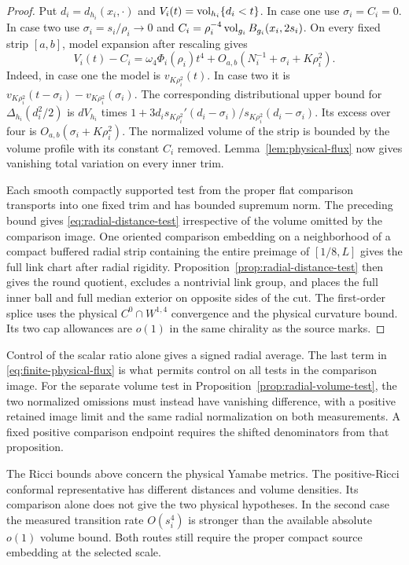 \begin{proof}
Put \(d_i=d_{h_i}(x_i,\cdot)\) and \(V_i(t)=\operatorname{vol}_{h_i}\{d_i<t\}\).
In case one use \(\sigma_i=C_i=0\). In case two use
\(\sigma_i=s_i/\rho_i\to0\) and
\(C_i=\rho_i^{-4}\operatorname{vol}_{g_i}B_{g_i}(x_i,2s_i)\).
On every fixed strip \([a,b]\), model expansion after
rescaling gives
\[
 V_i(t)-C_i=\omega_4\Phi_i(\rho_i)t^4
        +O_{a,b}(N_i^{-1}+\sigma_i+K\rho_i^2).
\]
Indeed, in case one the model is \(v_{K\rho_i^2}(t)\).
In case two it is
\(v_{K\rho_i^2}(t-\sigma_i)-v_{K\rho_i^2}(\sigma_i)\).
The corresponding distributional upper bound for
\(\Delta_{h_i}(d_i^2/2)\) is \(dV_{h_i}\) times
\(1+3d_i s_{K\rho_i^2}'(d_i-\sigma_i)/
s_{K\rho_i^2}(d_i-\sigma_i)\). Its excess over four is
\(O_{a,b}(\sigma_i+K\rho_i^2)\). The normalized volume
of the strip is bounded by the volume profile with its
constant \(C_i\) removed. Lemma~\ref{lem:physical-flux}
now gives vanishing total variation on every inner trim.

Each smooth compactly supported test from the proper flat
comparison transports into one fixed trim and has bounded
supremum norm. The preceding bound gives
\eqref{eq:radial-distance-test} irrespective of the volume
omitted by the comparison image. One oriented comparison
embedding on a neighborhood of a compact buffered radial
strip containing the entire preimage of \([1/8,L]\)
gives the full link chart after radial rigidity.
Proposition~\ref{prop:radial-distance-test} then gives the
round quotient, excludes a nontrivial link group, and
places the full inner ball and full median exterior on
opposite sides of the cut. The first-order splice uses
the physical \(C^0\cap W^{1,4}\) convergence and the
physical curvature bound. Its two cap allowances are
\(o(1)\) in the same chirality as the source marks.
\end{proof}

Control of the scalar ratio alone gives a signed radial
average. The last term in \eqref{eq:finite-physical-flux}
is what permits control on all tests in the comparison
image. For the separate volume test in
Proposition~\ref{prop:radial-volume-test}, the two
normalized omissions must instead have vanishing
difference, with a positive retained image limit and
the same radial normalization on both measurements.
A fixed positive comparison endpoint requires the
shifted denominators from that proposition.

The Ricci bounds above concern the physical Yamabe
metrics. The positive-Ricci conformal representative has
different distances and volume densities. Its comparison
alone does not give the two physical hypotheses. In the
second case the measured transition rate \(O(s_i^4)\)
is stronger than the available absolute \(o(1)\) volume bound.
Both routes still require the proper compact source
embedding at the selected scale.
